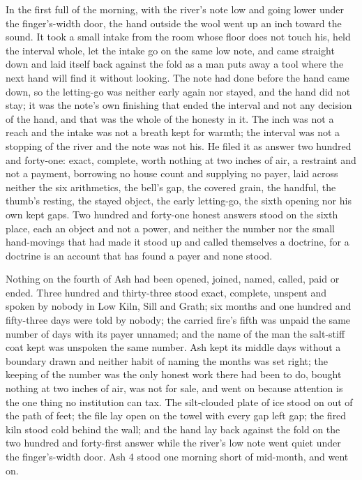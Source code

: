 In the first full of the morning, with the river's note low and going lower under the finger's-width door, the hand outside the wool went up an inch toward the sound. It took a small intake from the room whose floor does not touch his, held the interval whole, let the intake go on the same low note, and came straight down and laid itself back against the fold as a man puts away a tool where the next hand will find it without looking. The note had done before the hand came down, so the letting-go was neither early again nor stayed, and the hand did not stay; it was the note's own finishing that ended the interval and not any decision of the hand, and that was the whole of the honesty in it. The inch was not a reach and the intake was not a breath kept for warmth; the interval was not a stopping of the river and the note was not his. He filed it as answer two hundred and forty-one: exact, complete, worth nothing at two inches of air, a restraint and not a payment, borrowing no house count and supplying no payer, laid across neither the six arithmetics, the bell's gap, the covered grain, the handful, the thumb's resting, the stayed object, the early letting-go, the sixth opening nor his own kept gaps. Two hundred and forty-one honest answers stood on the sixth place, each an object and not a power, and neither the number nor the small hand-movings that had made it stood up and called themselves a doctrine, for a doctrine is an account that has found a payer and none stood.

Nothing on the fourth of Ash had been opened, joined, named, called, paid or ended. Three hundred and thirty-three stood exact, complete, unspent and spoken by nobody in Low Kiln, Sill and Grath; six months and one hundred and fifty-three days were told by nobody; the carried fire's fifth was unpaid the same number of days with its payer unnamed; and the name of the man the salt-stiff coat kept was unspoken the same number. Ash kept its middle days without a boundary drawn and neither habit of naming the months was set right; the keeping of the number was the only honest work there had been to do, bought nothing at two inches of air, was not for sale, and went on because attention is the one thing no institution can tax. The silt-clouded plate of ice stood on  out of the path of feet; the file lay open on the towel with every gap left gap; the fired kiln stood cold behind the wall; and the hand lay back against the fold on the two hundred and forty-first answer while the river's low note went quiet under the finger's-width door. Ash 4 stood one morning short of mid-month, and went on.
